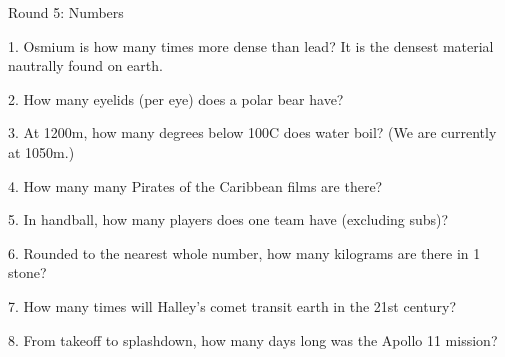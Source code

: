 \begin{frame}
\begin{center}
\Huge
Round 5: Numbers
\end{center}
\end{frame}
\begin{frame}
\begin{center}
\Large
1. Osmium is how many times more dense than lead? It is the densest material nautrally found on earth.
\end{center}
\end{frame}
\begin{frame}
\begin{center}
\Large
2. How many eyelids (per eye) does a polar bear have?
\end{center}
\end{frame}
\begin{frame}
\begin{center}
\Large
3. At 1200m, how many degrees below 100\textdegree C does water boil? (We are currently at 1050m.)
\end{center}
\end{frame}
\begin{frame}
\begin{center}
\Large
4. How many many Pirates of the Caribbean films are there?
\end{center}
\end{frame}
\begin{frame}
\begin{center}
\Large
5. In handball, how many players does one team have (excluding subs)?
\end{center}
\end{frame}
\begin{frame}
\begin{center}
\Large
6. Rounded to the nearest whole number, how many kilograms are there in 1 stone?
\end{center}
\end{frame}
\begin{frame}
\begin{center}
\Large
7. How many times will Halley's comet transit earth in the 21st century?
\end{center}
\end{frame}
\begin{frame}
\begin{center}
\Large
8. From takeoff to splashdown, how many days long was the Apollo 11 mission?
\end{center}
\end{frame}
